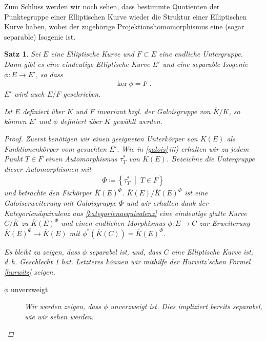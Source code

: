 \documentclass[english, german, parskip=half]{scrartcl}
\newtheorem{Satz}{Satz}[section]
\theoremstyle{definition}
\theoremstyle{remark}
\newcommand*{\K}{\ensuremath{K}} %
\newcommand*{\algK}{\ensuremath{\overline K}} %
\newcommand{\F}{F} %
\begin{document}
Zum Schluss werden wir noch sehen, dass bestimmte Quotienten der
Punktegruppe einer Elliptischen Kurve wieder die Struktur einer
Elliptischen Kurve haben, wobei der zugehörige
Projektionshomomorphismus eine (sogar separable) Isogenie ist.

\begin{Satz}
  Sei $E$ eine Elliptische Kurve und $\F\subset E$ eine endliche
  Untergruppe.
  Dann gibt es eine eindeutige Elliptische Kurve $E'$ und eine
  separable Isogenie $\phi\colon E\to E'$, so dass
  \begin{gather*}
    \ker\phi = \F \;.
  \end{gather*}
  $E'$ wird auch $E/\F$ geschrieben.

  Ist $E$ definiert über $K$ und $\F$ invariant bzgl. der Galoisgruppe
  von $\algK/\K$, so können $E'$ und $\phi$ definiert über $K$ gewählt
  werden.
  \begin{proof}
    Zuerst benötigen wir einen geeigneten Unterkörper von $\algK(E)$
    als Funktionenkörper vom gesuchten $E'$.
    Wie in \autoref{galois}\,\emph{iii)} erhalten wir zu jedem Punkt
    $T\in \F$ einen Automorphismus $\tau_T^*$ von $\algK(E)$.
    Bezeichne die Untergruppe dieser Automorphismen mit 
    \begin{gather*}
      \Phi\coloneqq\left\{ \tau_T^* \;\middle|\; T\in \F \right\}
    \end{gather*}
    und betrachte den Fixkörper $\algK(E)^\Phi$.    
    $\algK(E)/\algK(E)^\Phi$ ist eine Galoiserweiterung mit
    Galoisgruppe $\Phi$ und wir erhalten dank der Kategorienäquivalenz
    aus \autoref{kategorienaequivalenz} eine eindeutige glatte Kurve
    $C/\algK$ zu $\algK(E)^\Phi$ und einen endlichen Morphismus
    $\phi\colon E\to C$ zur Erweiterung $\algK(E)^\Phi\to\algK(E)$
    mit $\phi^*(\algK(C))=\algK(E)^\Phi$.
    
    Es bleibt zu zeigen, dass $\phi$ separabel ist, und, dass $C$ eine
    Elliptische Kurve ist, d.\,h. Geschlecht 1 hat.
    Letzteres können wir mithilfe der Hurwitz'schen Formel
    \autoref{hurwitz} zeigen.

    \begin{description}
    \item[$\phi$ unverzweigt]
      Wir werden zeigen, dass $\phi$ unverzweigt ist. Dies impliziert
      bereits separabel, wie wir sehen werden.


\end{description}
\end{proof}
\end{Satz}
\end{document}
